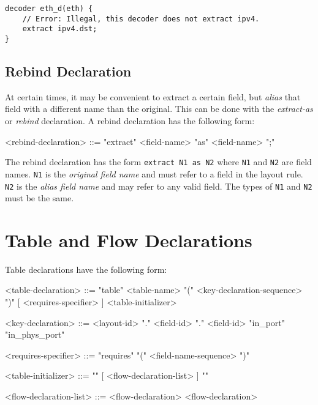 \begin{minip}
\begin{lstlisting}
decoder eth_d(eth) {
	// Error: Illegal, this decoder does not extract ipv4.
	extract ipv4.dst; 
}
\end{lstlisting}
\end{minip}

\subsection{Rebind Declaration} \label{guide:rebind}

At certain times, it may be convenient to extract a certain field, but \textit{alias} that field with a different name than the original. This can be done with the \textit{extract-as} or \textit{rebind} declaration. A rebind declaration has the following form:

\begin{minip}
\begin{grammar}
<rebind-declaration> ::=
"extract" <field-name> "as" <field-name> ";"
\end{grammar}
\end{minip}

The rebind declaration has the form \texttt{extract N1 as N2} where \texttt{N1} and \texttt{N2} are field names.
\texttt{N1} is the \textit{original field name} and must refer to a field in the layout rule. \texttt{N2} is the \textit{alias field name} and may refer to any valid field. The types of \texttt{N1} and \texttt{N2} must be the same.

\section{Table and Flow Declarations} \label{guide:tables}

Table declarations have the following form:

\begin{minip}
\begin{grammar}
<table-declaration> ::=
"table" <table-name> "(" <key-declaration-sequence> ")"
[ <requires-specifier> ] <table-initializer>

<key-declaration> ::=
<layout-id> "." <field-id>
 "." <field-id>
\alt "in_port"
\alt "in\_phys\_port"

<requires-specifier> ::=
"requires" "(" <field-name-sequence> ")"

<table-initializer> ::= "{" [ <flow-declaration-list> ] "}"

<flow-declaration-list> ::= <flow-declaration>
 <flow-declaration>
\end{grammar}
\end{minip}

